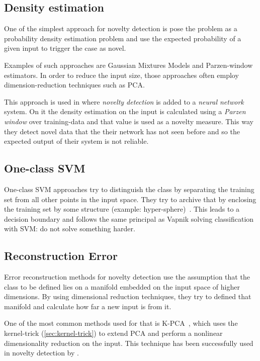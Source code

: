 \subsection{Density estimation}
One of the simplest approach for novelty detection is pose the problem as a probability density estimation problem and use the expected probability of a given input to trigger the case as novel.

Examples of such approaches are Gaussian Mixtures Models and Parzen-window estimators.
In order to reduce the input size, those approaches often employ dimension-reduction techniques such as \gls{PCA}.

This approach is used in \cite{bishop1994novelty} where \emph{novelty detection} is added to a \emph{neural network} system.
On it the density estimation on the input is calculated using a \emph{Parzen window} over training-data and that value is used as a novelty measure. This way they detect novel data that the their network has not seen before and so the expected output of their system is not reliable.

\subsection{One-class {SVM}}
One-class \gls{SVM} approaches try to distinguish the class by separating the training set from all other points in the input space. They try to archive that by enclosing the training set by some structure (example: hyper-sphere)~\citep{scholkopf2000support}.
This leads to a decision boundary and follows the same principal as Vapnik solving classification with \gls{SVM}: do not solve something harder.

\subsection{Reconstruction Error}
Error reconstruction methods for novelty detection use the assumption that the class to be defined lies on a manifold embedded on the input space of higher dimensions.
By using dimensional reduction techniques, they try to defined that manifold and calculate how far a new input is from it.

\label{sec:kernel-pca}
One of the most common methods used for that is \gls{K-PCA}~\citep{scholkopf1997kernel}, which uses the kernel-trick (\autoref{sec:kernel-trick}) to extend \gls{PCA} and perform a nonlinear dimensionality reduction on the input. This technique has been successfully used in novelty detection by \cite{Hoffmann2007863}.

